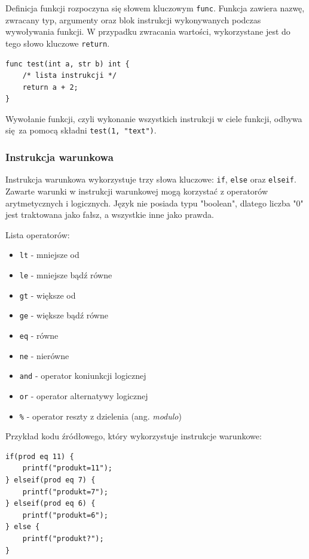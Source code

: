 Definicja funkcji rozpoczyna się słowem kluczowym \verb|func|. Funkcja zawiera nazwę, zwracany typ, argumenty oraz blok instrukcji wykonywanych podczas wywoływania funkcji. W przypadku zwracania wartości, wykorzystane jest do tego słowo kluczowe \verb|return|.

\begin{lstlisting}[caption={Definicja funkcji}, label={lst:jp-func}, morekeywords={func, str}]
func test(int a, str b) int {
    /* lista instrukcji */
    return a + 2;
}
\end{lstlisting}

Wywołanie funkcji, czyli wykonanie wszystkich instrukcji w ciele funkcji, odbywa się za pomocą składni \verb|test(1, "text")|.

\subsubsection{Instrukcja warunkowa}

Instrukcja warunkowa wykorzystuje trzy słowa kluczowe: \verb|if|, \verb|else| oraz \verb|elseif|. Zawarte warunki w instrukcji warunkowej mogą korzystać z operatorów arytmetycznych i logicznych. Język nie posiada typu "boolean", dlatego liczba "0" jest traktowana jako fałsz, a wszystkie inne jako prawda.

Lista operatorów:
\begin{itemize}
    \item \verb|lt| - mniejsze od
    \item \verb|le| - mniejsze bądź równe
    \item \verb|gt| - większe od
    \item \verb|ge| - większe bądź równe
    \item \verb|eq| - równe
    \item \verb|ne| - nierówne
    \item \verb|and| - operator koniunkcji logicznej
    \item \verb|or| - operator alternatywy logicznej
    \item \verb|%| - operator reszty z dzielenia (ang. \textit{modulo})
\end{itemize}

Przykład kodu źródłowego, który wykorzystuje instrukcje warunkowe:

\begin{lstlisting}[caption={Instrukcja warunkowa}, label={lst:jp-if}, morekeywords={elseif, eq}]
if(prod eq 11) {
    printf("produkt=11");
} elseif(prod eq 7) {
    printf("produkt=7");
} elseif(prod eq 6) {
    printf("produkt=6");
} else {
    printf("produkt?");
}
\end{lstlisting}


